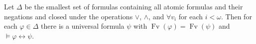 Let $\Delta$ be the smallest set of formulas containing all atomic formulas and their negations and closed under the operations $\vee$, $\wedge$, and $\forall v_i$ for each $i < \omega$. Then for each $\varphi \in \Delta$ there is a universal formula $\psi$ with $\operatorname{Fv}(\varphi) = \operatorname{Fv}(\psi)$ and $\models \varphi \leftrightarrow \psi$.

